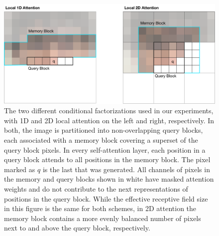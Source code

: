 \begin{figure}
  \includegraphics[scale=0.265]{ConditionalFactorizations.pdf}
  \caption{The two different conditional factorizations used in our experiments, with 1D and 2D local attention on the left and right, respectively. In both, the image is partitioned into non-overlapping query blocks, each associated with a memory block covering a superset of the query block pixels.
  In every self-attention layer, each position in a query block attends to all positions in the memory block.
  The pixel marked as $q$ is the last that was generated. All channels of pixels in the memory and query blocks shown in white have masked attention weights and do not contribute to the next representations of positions in the query block. While the effective receptive field size in this figure is the same for both schemes, in 2D attention the memory block
  contains a more evenly balanced number of pixels next to and above the query block, respectively.}
  \label{fig:conditional-factorizations}
\end{figure}



